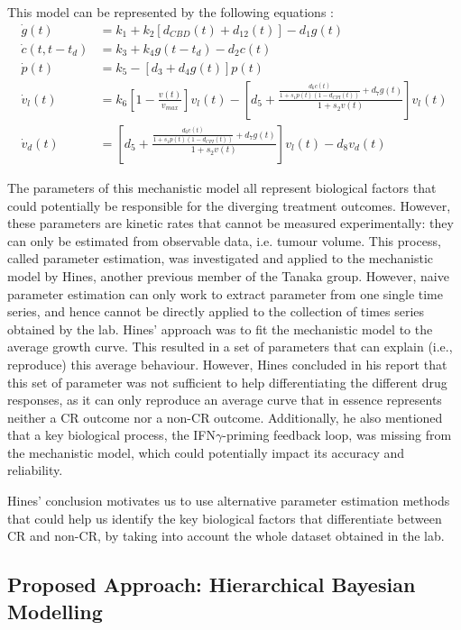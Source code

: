 \documentclass[11pt]{article}
\begin{document}
This model can be represented by the following equations \cite{takuya}: 
\begin{align*}
    \dot{g}(t) &= k_1 + k_2 [d_{CBD}(t) + d_{12}(t)] - d_1g(t) \\ 
    \dot{c}(t,t-t_d) &= k_3 + k_4g(t-t_d)-d_2c(t) \\ 
    \dot{p}(t) &= k_5 - [d_3 + d_4g(t)]p(t) \\ 
    \dot{v}_l(t) &= k_6\left[1 - \frac{v(t)}{v_{max}} \right]v_l(t) - \left[d_5 + \frac{\frac{d_6c(t)}{1+s_1p(t)(1-d_{CPI}(t))}+d_7g(t)}{1+s_2v(t)}\right]v_l(t)\\
    \dot{v}_d(t) &= \left[d_5 + \frac{\frac{d_6c(t)}{1+s_1p(t)(1-d_{CPI}(t))}+d_7g(t)}{1+s_2v(t)}\right]v_l(t) - d_8 v_d(t)
\end{align*}

The parameters of this mechanistic model all represent biological factors that could potentially be responsible for the diverging treatment outcomes. However, these parameters are kinetic rates that cannot be measured experimentally: they can only be estimated from observable data, i.e. tumour volume. This process, called parameter estimation, was investigated and applied to the mechanistic model by Hines, another previous member of the Tanaka group. However, naive parameter estimation can only work to extract parameter from one single time series, and hence cannot be directly applied to the collection of times series obtained by the lab. Hines' approach was to fit the mechanistic model to the average growth curve. This resulted in a set of parameters that can explain (i.e., reproduce) this average behaviour. However, Hines concluded in his report that this set of parameter was not sufficient to help differentiating the different drug responses, as it can only reproduce an average curve that in essence represents neither a CR outcome nor a non-CR outcome. Additionally, he also mentioned that a key biological process, the IFN$\gamma$-priming feedback loop, was missing from the mechanistic model, which could potentially impact its accuracy and reliability.

Hines' conclusion motivates us to use alternative parameter estimation methods that could help us identify the key biological factors that differentiate between CR and non-CR, by taking into account the whole dataset obtained in the lab.


\subsection{Proposed Approach: Hierarchical Bayesian Modelling}
\end{document}

